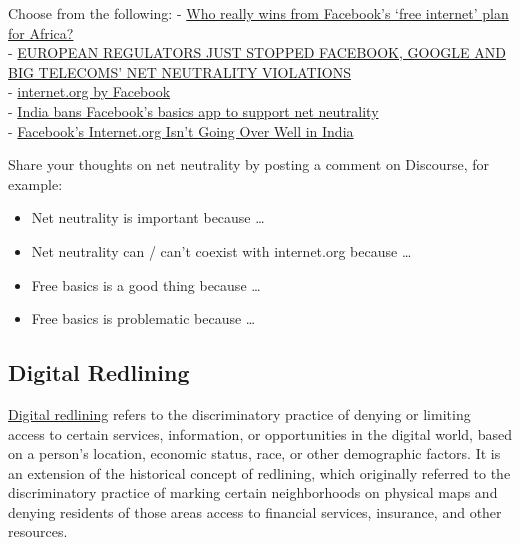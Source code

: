 \documentclass[
]{book}
\providecommand{\tightlist}{%
  \setlength{\itemsep}{0pt}\setlength{\parskip}{0pt}}
\theoremstyle{definition}
\theoremstyle{definition}
\theoremstyle{definition}
\theoremstyle{definition}
\theoremstyle{remark}
\begin{document}
\begin{reflect}
Choose from the following:
- \href{https://www.zdnet.com/article/who-really-wins-from-facebooks-free-internet-plan-for-africa/}{Who really wins from Facebook's `free internet' plan for Africa?}\\
- \href{https://cyberlaw.stanford.edu/blog/2022/06/european-regulators-just-stopped-facebook-google-and-big-telecoms-net-neutrality}{EUROPEAN REGULATORS JUST STOPPED FACEBOOK, GOOGLE AND BIG TELECOMS' NET NEUTRALITY VIOLATIONS}\\
- \href{https://en.wikipedia.org/wiki/Internet.org}{internet.org by Facebook}\\
- \href{https://www.wired.com/2016/02/facebooks-free-basics-app-is-now-banned-in-india/}{India bans Facebook's basics app to support net neutrality}\\
- \href{https://fortune.com/2016/01/22/facebook-india-internet/}{Facebook's Internet.org Isn't Going Over Well in India}

Share your thoughts on net neutrality by posting a comment on Discourse, for example:

\begin{itemize}
\tightlist
\item
  Net neutrality is important because \ldots{}\\
\item
  Net neutrality can / can't coexist with internet.org because \ldots{}\\
\item
  Free basics is a good thing because \ldots{}\\
\item
  Free basics is problematic because \ldots{}
\end{itemize}
\end{reflect}

\hypertarget{digital-redlining}{%
\subsection{Digital Redlining}\label{digital-redlining}}

\href{https://en.wikipedia.org/wiki/Digital_redlining\#:~:text=Digital\%20redlining\%20is\%20the\%20practice,digital\%20content\%2C\%20and\%20the\%20internet.}{Digital redlining} refers to the discriminatory practice of denying or limiting access to certain services, information, or opportunities in the digital world, based on a person's location, economic status, race, or other demographic factors. It is an extension of the historical concept of redlining, which originally referred to the discriminatory practice of marking certain neighborhoods on physical maps and denying residents of those areas access to financial services, insurance, and other resources.
\end{document}
